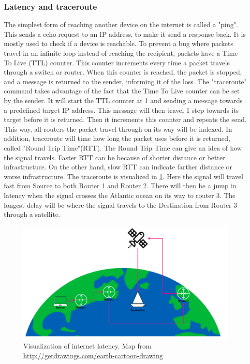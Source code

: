 \subsubsection{Latency and traceroute} \label{sec:latency_method}
The simplest form of reaching another device on the internet is called a "ping". This sends a echo request to an IP address, to make it send a response back. It is mostly used to check if a device is reachable. To prevent a bug where packets travel in an infinite loop instead of reaching the recipient, packets have a Time To Live (TTL) counter. This counter increments every time a packet travels through a switch or router. When this counter is reached, the packet is stopped, and a message is returned to the sender, informing it of the loss.
The "traceroute" command takes advantage of the fact that the Time To Live counter can be set by the sender. It will start the TTL counter at 1 and sending a message towards a predefined target IP address. This message will then travel 1 step towards its target before it is returned. Then it increments this counter and repeats the send. This way, all routers the packet travel through on its way will be indexed. In addition, traceroute will time how long the packet uses before it is returned, called "Round Trip Time"(RTT).
The Round Trip Time can give an idea of how the signal travels. Faster RTT can be because of shorter distance or better infrastructure. On the other hand, slow RTT can indicate farther distance or worse infrastructure.
The traceroute is visualized in \cref{fig:latency}. Here the signal will travel fast from Source to both Router 1 and Router 2. There will then be a jump in latency when the signal crosses the Atlantic ocean on its way to router 3. The longest delay will be where the signal travels to the Destination from Router 3 through a satellite.

\begin{figure} [H]
    \centering
    \includegraphics[scale=0.3]{Figurer/latency.png}
    \caption{Visualization of internet latency. Map from \href{http://getdrawings.com/earth-cartoon-drawing}{http://getdrawings.com/earth-cartoon-drawing}}
    \label{fig:latency}
\end{figure}

